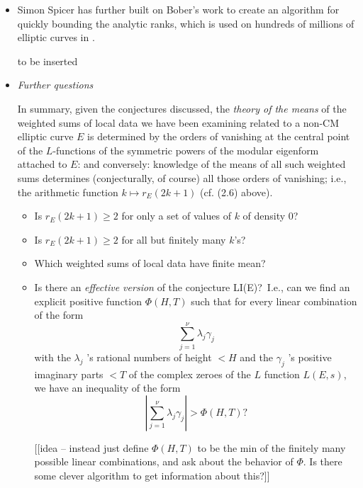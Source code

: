 \documentclass[11pt]{article}
\theoremstyle{plain}
\theoremstyle{definition}
\numberwithin{equation}{section}
\numberwithin{figure}{section}
\numberwithin{table}{section}
\def\Q{\bf{Q}}
\begin{document}
\begin{itemize}
\item Simon Spicer has further built on
Bober's work to create an algorithm for quickly bounding the analytic
ranks, which is used on hundreds of millions of elliptic
curves in \cite[\S 2.3]{ecdb:height}.

\centerline{to be inserted}
\vskip10pt
\item {\it Further questions}

 In summary, given the conjectures discussed, the {\it theory of the means} of the  weighted sums of local data we have been examining related to a non-CM elliptic curve $E$ is determined by the orders of vanishing at the central point of the $L$-functions of the symmetric powers of the modular eigenform attached to $E$: and conversely: knowledge of the means of all such weighted sums determines (conjecturally, of course) all those orders of vanishing; i.e., the arithmetic function  $k \mapsto r_E(2k+1)$ (cf. (2.6) above).
\begin{itemize}\item
Is $r_E(2k+1)\ge 2$ for  only a set of values of $k$ of density $0$?
 \item  Is  $r_E(2k+1)\ge 2$ for all but finitely many $k$'s?  \item Which weighted sums of local data have finite mean?
\item  Is there an  {\it effective version}  of  the conjecture LI(E)?\  I.e., can we find  an explicit  positive function $\Phi(H,T)$ such that for every linear combination of the form $$\sum_{j=1}^{\nu} \lambda_j\gamma_j$$ with the $\lambda_j$ 's rational numbers of height $< H$ and the  $\gamma_j$ 's  positive imaginary parts $<T$ of the complex zeroes of the $L$ function $L(E,s)$, we have  an inequality of the form $$\left|\sum_{j=1}^{\nu} \lambda_j\gamma_j\right|  > \Phi(H, T)?$$

[[idea -- instead just define $\Phi(H,T)$ to be the min
of the finitely many possible linear combinations, and ask
about the behavior of $\Phi$.  Is there some clever algorithm
to get information about this?]]
\end{itemize}\end{itemize}

\end{document}
